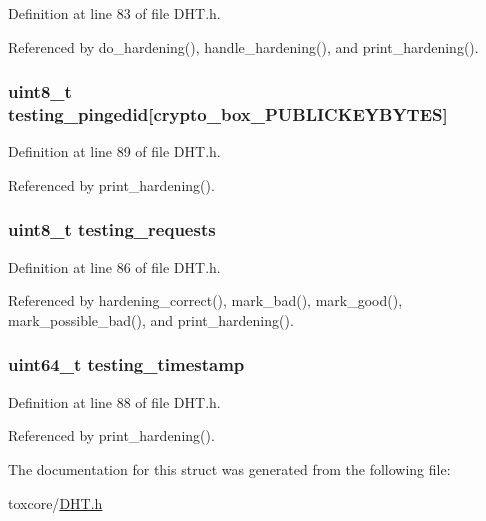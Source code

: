 Definition at line 83 of file D\+H\+T.\+h.



Referenced by do\+\_\+hardening(), handle\+\_\+hardening(), and print\+\_\+hardening().

\hypertarget{struct_hardening_a4756e4396c1fe15e6ba6bdac38a60eee}{
\subsubsection[{testing\+\_\+pingedid}]{\setlength{\rightskip}{0pt plus 5cm}uint8\+\_\+t testing\+\_\+pingedid\mbox{[}crypto\+\_\+box\+\_\+\+P\+U\+B\+L\+I\+C\+K\+E\+Y\+B\+Y\+T\+E\+S\mbox{]}}}\label{struct_hardening_a4756e4396c1fe15e6ba6bdac38a60eee}


Definition at line 89 of file D\+H\+T.\+h.



Referenced by print\+\_\+hardening().

\hypertarget{struct_hardening_a48c7621d77e824da8df2c8a7caa79d25}{
\subsubsection[{testing\+\_\+requests}]{\setlength{\rightskip}{0pt plus 5cm}uint8\+\_\+t testing\+\_\+requests}}\label{struct_hardening_a48c7621d77e824da8df2c8a7caa79d25}


Definition at line 86 of file D\+H\+T.\+h.



Referenced by hardening\+\_\+correct(), mark\+\_\+bad(), mark\+\_\+good(), mark\+\_\+possible\+\_\+bad(), and print\+\_\+hardening().

\hypertarget{struct_hardening_a3de9f4ec78dd99c4ca1a142e1c65fcee}{
\subsubsection[{testing\+\_\+timestamp}]{\setlength{\rightskip}{0pt plus 5cm}uint64\+\_\+t testing\+\_\+timestamp}}\label{struct_hardening_a3de9f4ec78dd99c4ca1a142e1c65fcee}


Definition at line 88 of file D\+H\+T.\+h.



Referenced by print\+\_\+hardening().



The documentation for this struct was generated from the following file\+:\begin{DoxyCompactItemize}
\item 
toxcore/\hyperlink{_d_h_t_8h}{D\+H\+T.\+h}\end{DoxyCompactItemize}

